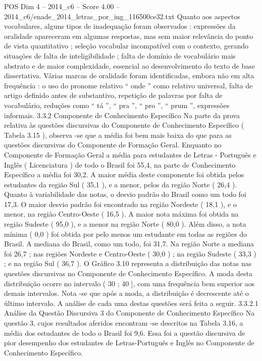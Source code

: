 \begin{textsample}{POS Dim 4 – 2014\_c6 – Score 4.00 – 2014\_c6/enade\_2014\_letras\_por\_ing\_116500ce32.txt}
Quanto aos aspectos vocabulares, alguns tipos de inadequação foram observados : expressões da oralidade apareceram em algumas respostas, mas sem maior relevância do ponto de vista quantitativo ; seleção vocabular incompatível com o contexto, gerando situações de falta de inteligibilidade ; falta de domínio de vocabulário mais abstrato e de maior complexidade, essencial ao desenvolvimento do texto de base dissertativa.
Várias marcas de oralidade foram identificadas, embora não em alta frequência : o uso do pronome relativo “ onde ” como relativo universal, falta de artigo definido antes de substantivo, repetição de palavras por falta de vocabulário, reduções como “ tá ”, “ pra ”, “ pro ”, “ prum ”, expressões informais. 3.3.2 Componente de Conhecimento Específico Na parte da prova relativa às questões discursivas do Componente de Conhecimento Específico ( Tabela 3.15 ), observa -se que a média foi bem mais baixa do que para as questões discursivas do Componente de Formação Geral.
Enquanto no Componente de Formação Geral a média para estudantes de Letras - Português e Inglês ( Licenciatura ) de todo o Brasil foi 55,4, na parte de Conhecimento Específico a média foi 30,2.
A maior média deste componente foi obtida pelos estudantes da região Sul ( 35,1 ), e a menor, pelos da região Norte ( 26,4 ).
Quanto à variabilidade das notas, o desvio padrão do Brasil como um todo foi 17,3.
O maior desvio padrão foi encontrado na região Nordeste ( 18,1 ), e o menor, na região Centro-Oeste ( 16,5 ).
A maior nota máxima foi obtida na região Sudeste ( 95,0 ), e a menor na região Norte ( 80,0 ).
Além disso, a nota mínima ( 0,0 ) foi obtida por pelo menos um estudante em todas as regiões do Brasil.
A mediana do Brasil, como um todo, foi 31,7.
Na região Norte a mediana foi 26,7 ; nas regiões Nordeste e Centro-Oeste ( 30,0 ) ; na região Sudeste ( 33,3 ) ; e na região Sul ( 36,7 ).
O Gráfico 3.10 representa a distribuição das notas nas questões discursivas no Componente de Conhecimento Específico.
A moda desta distribuição ocorre no intervalo ( 30 ; 40 ], com uma frequência bem superior aos demais intervalos.
Nota -se que após a moda, a distribuição é decrescente até o último intervalo.
A análise de cada uma destas questões será feita a seguir. 3.3.2.1 Análise da Questão Discursiva 3 do Componente de Conhecimento Específico Na questão 3, cujos resultados aferidos encontram -se descritos na Tabela 3.16, a média dos estudantes de todo o Brasil foi 9,6.
Essa foi a questão discursiva de pior desempenho dos estudantes de Letras-Português e Inglês no Componente de Conhecimento Específico.

\end{textsample}

